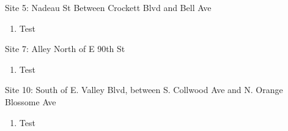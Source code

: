 \documentclass{article}
\newenvironment{pres}[2]{%
  \large{#2}
}
{
  \goodbreak
  \smallskip
}
\begin{document}
\begin{pres}{}{Site 5: Nadeau St Between Crockett Blvd and Bell Ave}
  \begin{enumerate}[noitemsep]
      \item Test
  \end{enumerate}
\end{pres}

\begin{pres}{}{Site 7: Alley North of E 90th St }
  \begin{enumerate}[noitemsep]
      \item Test
  \end{enumerate}
\end{pres}

\begin{pres}{}{Site 10: South of E. Valley Blvd, between S. Collwood Ave and N. Orange Blossome Ave}
  \begin{enumerate}[noitemsep]
      \item Test
  \end{enumerate}
\end{pres}



\end{document}
